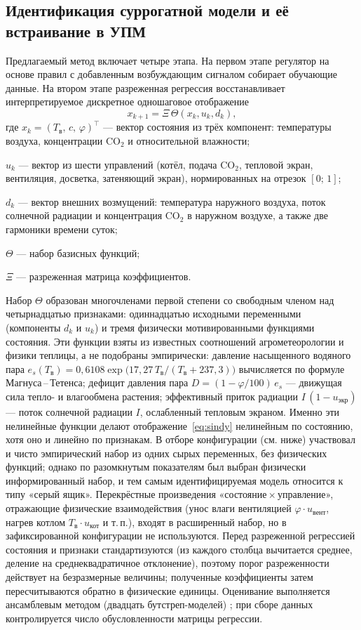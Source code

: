 \documentclass[12pt,a4paper,leqno]{article}
\newcommand{\Tin}{T_{\text{в}}}          %
\begin{document}
\subsection{Идентификация суррогатной модели и её встраивание в УПМ}
Предлагаемый метод включает четыре этапа. На первом этапе регулятор на основе правил с
добавленным возбуждающим сигналом собирает обучающие данные. На втором этапе разреженная
регрессия восстанавливает интерпретируемое дискретное одношаговое отображение
\begin{equation}
x_{k+1}=\Xi\,\Theta(x_k,u_k,d_k),
\label{eq:sindy}
\end{equation}
где $x_k=(\Tin,\,c,\,\varphi)^\top$ — вектор состояния из трёх компонент: температуры
воздуха, концентрации CO$_2$ и относительной влажности;\par
\noindent $u_k$ — вектор из шести управлений (котёл, подача CO$_2$, тепловой экран,
вентиляция, досветка, затеняющий экран), нормированных на отрезок $[0;\,1]$;\par
\noindent $d_k$ — вектор внешних возмущений: температура наружного воздуха, поток солнечной
радиации и концентрация CO$_2$ в наружном воздухе, а также две гармоники времени суток;\par
\noindent $\Theta$ — набор базисных функций;\par
\noindent $\Xi$ — разреженная матрица коэффициентов.\par
Набор $\Theta$ образован многочленами первой степени со свободным членом над
четырнадцатью признаками: одиннадцатью исходными переменными (компоненты $d_k$ и $u_k$)
и тремя физически мотивированными функциями состояния. Эти функции взяты из известных
соотношений агрометеорологии и физики теплицы, а не подобраны эмпирически: давление
насыщенного водяного пара $e_s(\Tin)=0{,}6108\exp\!\bigl(17{,}27\,\Tin/(\Tin+237{,}3)\bigr)$
вычисляется по формуле Магнуса\,--\,Тетенса; дефицит давления пара
$D=(1-\varphi/100)\,e_s$ — движущая сила тепло- и влагообмена растения; эффективный
приток радиации $I\,(1-u_{\text{экр}})$ — поток солнечной радиации $I$, ослабленный
тепловым экраном. Именно эти нелинейные функции делают отображение~\eqref{eq:sindy}
нелинейным по состоянию, хотя оно и линейно по признакам. В отборе конфигурации (см.
ниже) участвовал и чисто эмпирический набор из одних сырых переменных, без физических
функций; однако по разомкнутым показателям был выбран физически информированный набор,
и тем самым идентифицируемая модель относится к типу «серый ящик». Перекрёстные
произведения «состояние\,$\times$\,управление», отражающие физические взаимодействия
(унос влаги вентиляцией $\varphi\!\cdot u_{\text{вент}}$, нагрев котлом
$\Tin\!\cdot u_{\text{кот}}$ и т.\,п.), входят в расширенный набор, но в зафиксированной
конфигурации не используются. Перед разреженной регрессией состояния
и признаки стандартизуются (из каждого столбца вычитается среднее, деление на
среднеквадратичное отклонение), поэтому порог разреженности действует на безразмерные
величины; полученные коэффициенты затем пересчитываются обратно в физические единицы.
Оценивание выполняется ансамблевым методом (двадцать бутстреп-моделей)
\cite{fasel2022}; при сборе данных контролируется число обусловленности матрицы
регрессии.
\end{document}
